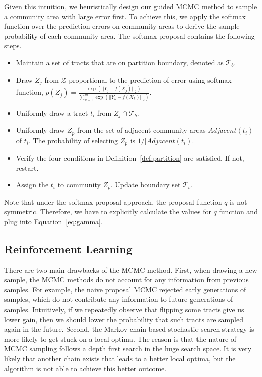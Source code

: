 Given this intuition, we heuristically design our guided MCMC method to sample a community area with large error first. To achieve this, we apply the softmax function over the prediction errors on community areas to derive the sample probability of each community area. The softmax proposal contains the following steps. 
\begin{itemize}
  \item Maintain a set of tracts that are on partition boundary, denoted as $\mathcal{T}_b$.
  \item Draw $Z_j$ from $\mathcal{Z}$ proportional to the prediction of error using softmax function, $p(Z_j) = \frac{ \exp(||Y_j - f(X_j)||_2) }{ \sum_{k=1}^m \exp(||Y_k - f(X_k)||_2)}$.
  \item Uniformly draw a tract $t_i$ from $Z_j \cap \mathcal{T}_b$.
  \item Uniformly draw $Z_p$ from the set of adjacent community areas $Adjacent(t_i)$ of $t_i$. The probability of selecting $Z_p$ is $1/|Adjacent(t_i)$.
  \item Verify the four conditions in Definition~\ref{def:partition} are satisfied. If not, restart.
  \item Assign the $t_i$ to community $Z_p$. Update boundary set $\mathcal{T}_b$.
\end{itemize}

Note that under the softmax proposal approach, the proposal function $q$ is not symmetric. Therefore, we have to explicitly calculate the values for $q$ function and plug into Equation~\ref{eq:gamma}.



\subsection{Reinforcement Learning}

There are two main drawbacks of the MCMC method. First, when drawing a new sample, the MCMC methods do not account for any information from previous samples.  For example, the naive proposal MCMC rejected early generations of samples, which do not contribute any information to future generations of samples. Intuitively, if we repeatedly observe that flipping some tracts give us lower gain, then we should lower the probability that such tracts are sampled again in the future. Second, the Markov chain-based stochastic search strategy is more likely to get stuck on a local optima. The reason is that the nature of MCMC sampling follows a depth first search in the huge search space. It is very likely that another chain exists that leads to a better local optima, but the algorithm is not able to achieve this better outcome.


